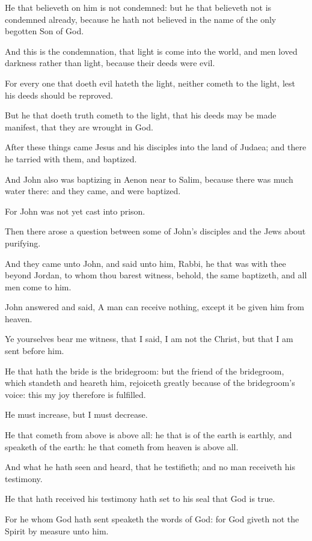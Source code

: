 \Verse He that believeth on him is not condemned: but he that believeth not is condemned already, because he hath not believed in the name of the only begotten Son of God.

\Verse And this is the condemnation, that light is come into the world, and men loved darkness rather than light, because their deeds were evil.

\Verse For every one that doeth evil hateth the light, neither cometh to the light, lest his deeds should be reproved.

\Verse But he that doeth truth cometh to the light, that his deeds may be made manifest, that they are wrought in God.

\Verse After these things came Jesus and his disciples into the land of Judaea; and there he tarried with them, and baptized.

\Verse And John also was baptizing in Aenon near to Salim, because there was much water there: and they came, and were baptized.

\Verse For John was not yet cast into prison.

\Verse Then there arose a question between some of John's disciples and the Jews about purifying.

\Verse And they came unto John, and said unto him, Rabbi, he that was with thee beyond Jordan, to whom thou barest witness, behold, the same baptizeth, and all men come to him.

\Verse John answered and said, A man can receive nothing, except it be given him from heaven.

\Verse Ye yourselves bear me witness, that I said, I am not the Christ, but that I am sent before him.

\Verse He that hath the bride is the bridegroom: but the friend of the bridegroom, which standeth and heareth him, rejoiceth greatly because of the bridegroom's voice: this my joy therefore is fulfilled.

\Verse He must increase, but I must decrease.

\Verse He that cometh from above is above all: he that is of the earth is earthly, and speaketh of the earth: he that cometh from heaven is above all.

\Verse And what he hath seen and heard, that he testifieth; and no man receiveth his testimony.

\Verse He that hath received his testimony hath set to his seal that God is true.

\Verse For he whom God hath sent speaketh the words of God: for God giveth not the Spirit by measure unto him.

